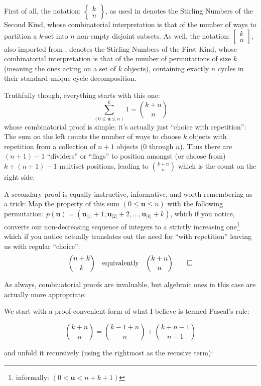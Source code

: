 \documentclass[twoside]{amsart}
\newcommand{\bu}[1][u]{\ensuremath{\mathbf #1}}
\begin{document}
First of all, the notation:
$  \left\{\!\!\!\begin{array}{c} k \\ n \end{array}\!\!\!\right\}  $, as
used in \cite{gkp} denotes the Stirling Numbers of the Second Kind, whose
combinatorial interpretation is that of the number of ways to partition a
$  k  $-set into $  n  $ non-empty disjoint subsets.  As well, the notation:
$  \left[\!\!\!\begin{array}{c} k \\ n \end{array}\!\!\!\right]  $, also
imported from \cite{gkp}, denotes the Stirling Numbers of the First Kind,
whose combinatorial interpretation is that of the number of permutations of
size $  k  $ (meaning the ones acting on a set of $  k  $ objects), containing 
exactly $  n  $ cycles in their standard unique cycle decomposition.

\newpage

Truthfully though, everything starts with this one:
$$ \sum_{(0\le\bu\le n)}^k\!\!\!\!\! 1={k+n\choose n} $$
whose combinatorial proof is simple; it's actually just ``choice with repetition'': The sum on the
left counts the number of ways to choose $ k $ objects with repetition from a collection of $ n+1 $
objects ($ 0 $ through $ n $). Thus there are $ (n+1)-1 $ ``dividers'' or ``flags'' to position amongst
(or choose from) $ k+(n+1)-1 $ multiset positions, leading to $ {k+n\choose n} $ which is the count on
the right side.

A secondary proof is equally instructive, informative, and worth remembering as a trick: Map the
property of this sum $ (0\le\bu\le n) $ with the following permutation:
$ p(\bu)=(\bu_{|1|}+1, \bu_{|2|}+2, \ldots, \bu_{|k|}+k) $, which if you notice, converts our
non-decreasing sequence of integers to a strictly increasing one\footnote{informally: $ (0 < \bu < n+k+1) $}
which if you notice actually translates out the need for ``with repetition'' leaving us with regular ``choice'':
$$ {n+k\choose k}\quad\mbox{equivalently}\quad {k+n\choose n}\qed $$

As always, combinatorial proofs are invaluable, but algebraic ones in this case are actually more appropriate:

We start with a proof-convenient form of what I believe is termed Pascal's rule:

$$ {k+n\choose n}={k-1+n\choose n}+{k+n-1\choose n-1} $$

and unfold it recursively (using the rightmost as the recusive term):
\end{document}
